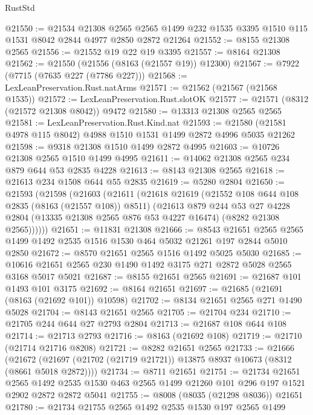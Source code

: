\begin{lexlean}{RustStd}
\begin{coremodule}
@21550 := @21534
    @21308
    @2565
    @2565
    @1499
    @232
    @1535
    @3395
    @1510
    @115
    @1531
    @8042
    @2844
    @4977
    @2850
    @2872
    @21264
@21552 := @8155 @21308 @2565
@21556 := @21552 @19 @22 @19 @3395
@21557 := @8164 @21308
@21562 := @21550 (@21556 (@8163 (@21557 @19)) @12300)
@21567 := @7922 (@7715 (@7635 @227 (@7786 @227)))
@21568 := LexLeanPreservation.Rust.natArms
@21571 := @21562 (@21567 (@21568 @1535))
@21572 := LexLeanPreservation.Rust.slotOK
@21577 := @21571 (@8312 (@21572 @21308 @8042)) @9472
@21580 := @13313 @21308 @2565 @2565
@21581 := LexLeanPreservation.Rust.Kind.nat
@21593 := @21580 (@21581 @4978 @115 @8042) @4988 @1510 @1531 @1499 @2872 @4996 @5035 @21262
@21598 := @9318 @21308 @1510 @1499 @2872 @4995
@21603 := @10726 @21308 @2565 @1510 @1499 @4995
@21611 := @14062 @21308 @2565 @234 @879 @644 @53 @2835 @4228
@21613 := @8143 @21308 @2565
@21618 := @21613 @234 @1508 @644 @55 @2835
@21619 := @5280 @2804
@21650 := @21593
    (@21598
      (@21603
        (@21611
          (@21618
            @21619
            (@21552 @108 @644 @108 @2835 (@8163 (@21557 @108)) @8511)
            (@21613
              @879
              @244
              @53
              @27
              @4228
              @2804
              (@13335 @21308 @2565 @876 @53 @4227 @16474)
              (@8282 @21308 @2565))))))
@21651 := @11831 @21308
@21666 := @8543
    @21651
    @2565
    @2565
    @1499
    @1492
    @2535
    @1516
    @1530
    @464
    @5032
    @21261
    @197
    @2844
    @5010
    @2850
@21672 := @8570 @21651 @2565 @1516 @1492 @5025 @5030
@21685 := @10616 @21651 @2565 @230 @1490 @1492 @3175 @271 @2872 @5028 @2565 @3168 @5017 @5021
@21687 := @8155 @21651 @2565
@21691 := @21687 @101 @1493 @101 @3175
@21692 := @8164 @21651
@21697 := @21685 (@21691 (@8163 (@21692 @101)) @10598)
@21702 := @8134 @21651 @2565 @271 @1490 @5028
@21704 := @8143 @21651 @2565
@21705 := @21704 @234
@21710 := @21705 @244 @644 @27 @2793 @2804
@21713 := @21687 @108 @644 @108
@21714 := @21713 @2793
@21716 := @8163 (@21692 @108)
@21719 := @21710 (@21714 @21716 @8208)
@21721 := @8282 @21651 @2565
@21733 := @21666
    (@21672 (@21697 (@21702 (@21719 @21721)) @13875 @8937 @10673 (@8312 (@8661 @5018 @2872))))
@21734 := @8711 @21651
@21751 := @21734
    @21651
    @2565
    @1492
    @2535
    @1530
    @463
    @2565
    @1499
    @21260
    @101
    @296
    @197
    @1521
    @2902
    @2872
    @2872
    @5041
@21755 := @8008 (@8035 (@21298 @8036)) @21651
@21780 := @21734
    @21755
    @2565
    @1492
    @2535
    @1530
    @197
    @2565
    @1499

\end{coremodule}
\end{lexlean}
